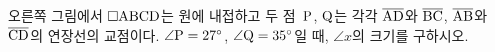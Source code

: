\noindent\begin{minipage}[t]{0.58\linewidth}\vspace{0pt}\raggedright 오른쪽 그림에서 $\square\mathrm{ABCD}$는 원에 내접하고 두 점~$\mathrm{P}$, $\mathrm{Q}$는 각각 $\overline{\mathrm{AD}}$와 $\overline{\mathrm{BC}}$, $\overline{\mathrm{AB}}$와 $\overline{\mathrm{CD}}$의 연장선의 교점이다. $\angle\mathrm{P}=27^\circ$, $\angle\mathrm{Q}=35^\circ$일 때, $\angle x$의 크기를 구하시오.\end{minipage}\hfill\begin{minipage}[t]{0.4\linewidth}\vspace{0pt}\centering \resizebox{\ifdim\width>\linewidth\linewidth\else\width\fi}{!}{}\end{minipage}\par
